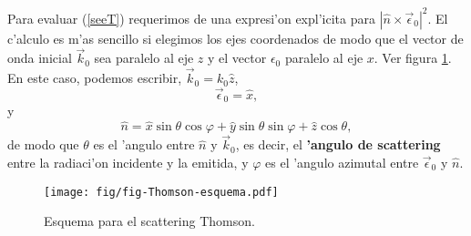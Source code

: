 Para evaluar (\ref{seeT}) requerimos de una expresi'on expl'icita para
$\left|\hat{n}\times\vec{\epsilon}_0\right|^2$. El c'alculo es m'as sencillo si elegimos los ejes coordenados de modo que el vector de onda inicial $\vec{k}_0$ sea paralelo al eje $z$ y el vector $\epsilon_0$ paralelo al eje $x$. Ver figura \ref{fig:thomson}. En este caso, podemos escribir, $\vec{k}_0=k_0\hat{z}$, 
\begin{equation}\label{epsilon0}
\vec\epsilon_0=\hat{x},
\end{equation}
y 
\begin{equation}
\hat{n}=\hat{x}\sin\theta\cos\varphi + \hat{y}\sin\theta\sin\varphi +\hat{z}\cos\theta, \label{ene}
\end{equation}
de modo que $\theta$ es el 'angulo entre $\hat{n}$ y $\vec{k}_0$, es decir, el
\textbf{'angulo de scattering} entre la radiaci'on incidente y la emitida, y $\varphi$ es el 'angulo azimutal entre $\vec{\epsilon}_0$ y
$\hat{n}$.
\begin{figure}[H]
\centerline{\texttt{[image: fig/fig-Thomson-esquema.pdf]}}
 \caption{Esquema para el scattering Thomson.}
\label{fig:thomson}
\end{figure}
